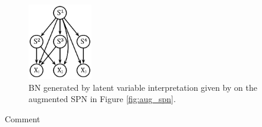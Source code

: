 \begin{figure}[h]
    \begin{center}
		\includegraphics[width=0.25\textwidth]{figures/bn_peharz.png}
		\caption{BN generated by latent variable interpretation given by \cite{peharz2015theoretical} on the augmented SPN in Figure \ref{fig:aug_spn}.}
		\label{fig:bn_poupart}
    \end{center}
\end{figure}

Comment